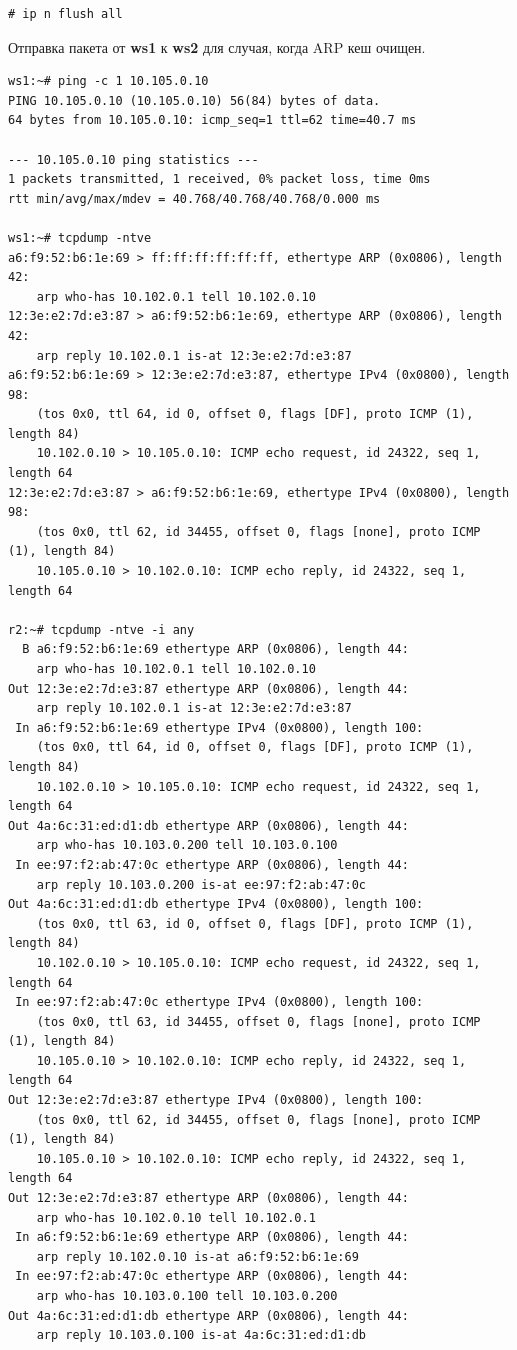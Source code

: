\documentclass[a4paper,12pt]{article}
\begin{document}
\begin{Verbatim}
# ip n flush all
\end{Verbatim}

Отправка пакета от \textbf{ws1} к \textbf{ws2} для случая, когда ARP кеш очищен.

\begin{Verbatim}
ws1:~# ping -c 1 10.105.0.10
PING 10.105.0.10 (10.105.0.10) 56(84) bytes of data.
64 bytes from 10.105.0.10: icmp_seq=1 ttl=62 time=40.7 ms

--- 10.105.0.10 ping statistics ---
1 packets transmitted, 1 received, 0% packet loss, time 0ms
rtt min/avg/max/mdev = 40.768/40.768/40.768/0.000 ms

ws1:~# tcpdump -ntve
a6:f9:52:b6:1e:69 > ff:ff:ff:ff:ff:ff, ethertype ARP (0x0806), length 42:
    arp who-has 10.102.0.1 tell 10.102.0.10
12:3e:e2:7d:e3:87 > a6:f9:52:b6:1e:69, ethertype ARP (0x0806), length 42:
    arp reply 10.102.0.1 is-at 12:3e:e2:7d:e3:87
a6:f9:52:b6:1e:69 > 12:3e:e2:7d:e3:87, ethertype IPv4 (0x0800), length 98:
    (tos 0x0, ttl 64, id 0, offset 0, flags [DF], proto ICMP (1), length 84)
    10.102.0.10 > 10.105.0.10: ICMP echo request, id 24322, seq 1, length 64
12:3e:e2:7d:e3:87 > a6:f9:52:b6:1e:69, ethertype IPv4 (0x0800), length 98:
    (tos 0x0, ttl 62, id 34455, offset 0, flags [none], proto ICMP (1), length 84)
    10.105.0.10 > 10.102.0.10: ICMP echo reply, id 24322, seq 1, length 64

r2:~# tcpdump -ntve -i any
  B a6:f9:52:b6:1e:69 ethertype ARP (0x0806), length 44:
    arp who-has 10.102.0.1 tell 10.102.0.10
Out 12:3e:e2:7d:e3:87 ethertype ARP (0x0806), length 44:
    arp reply 10.102.0.1 is-at 12:3e:e2:7d:e3:87
 In a6:f9:52:b6:1e:69 ethertype IPv4 (0x0800), length 100:
    (tos 0x0, ttl 64, id 0, offset 0, flags [DF], proto ICMP (1), length 84)
    10.102.0.10 > 10.105.0.10: ICMP echo request, id 24322, seq 1, length 64
Out 4a:6c:31:ed:d1:db ethertype ARP (0x0806), length 44:
    arp who-has 10.103.0.200 tell 10.103.0.100
 In ee:97:f2:ab:47:0c ethertype ARP (0x0806), length 44:
    arp reply 10.103.0.200 is-at ee:97:f2:ab:47:0c
Out 4a:6c:31:ed:d1:db ethertype IPv4 (0x0800), length 100:
    (tos 0x0, ttl 63, id 0, offset 0, flags [DF], proto ICMP (1), length 84)
    10.102.0.10 > 10.105.0.10: ICMP echo request, id 24322, seq 1, length 64
 In ee:97:f2:ab:47:0c ethertype IPv4 (0x0800), length 100:
    (tos 0x0, ttl 63, id 34455, offset 0, flags [none], proto ICMP (1), length 84)
    10.105.0.10 > 10.102.0.10: ICMP echo reply, id 24322, seq 1, length 64
Out 12:3e:e2:7d:e3:87 ethertype IPv4 (0x0800), length 100:
    (tos 0x0, ttl 62, id 34455, offset 0, flags [none], proto ICMP (1), length 84)
    10.105.0.10 > 10.102.0.10: ICMP echo reply, id 24322, seq 1, length 64
Out 12:3e:e2:7d:e3:87 ethertype ARP (0x0806), length 44:
    arp who-has 10.102.0.10 tell 10.102.0.1
 In a6:f9:52:b6:1e:69 ethertype ARP (0x0806), length 44:
    arp reply 10.102.0.10 is-at a6:f9:52:b6:1e:69
 In ee:97:f2:ab:47:0c ethertype ARP (0x0806), length 44:
    arp who-has 10.103.0.100 tell 10.103.0.200
Out 4a:6c:31:ed:d1:db ethertype ARP (0x0806), length 44:
    arp reply 10.103.0.100 is-at 4a:6c:31:ed:d1:db


\end{Verbatim}
\end{document}
